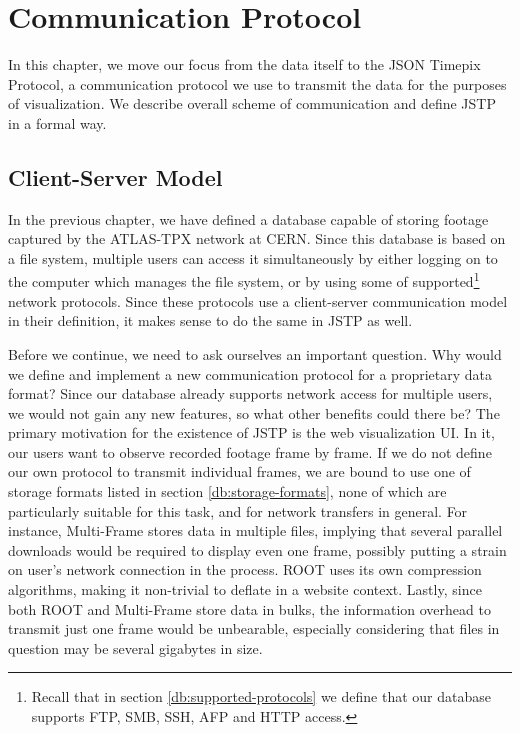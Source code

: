 \chapter{Communication Protocol}

In this chapter, we move our focus from the data itself to the JSON Timepix Protocol, a communication protocol we use to transmit the data for the purposes of visualization. We describe overall scheme of communication and define JSTP in a formal way.

\section{Client-Server Model}
In the previous chapter, we have defined a database capable of storing footage captured by the ATLAS-TPX network at CERN. Since this database is based on a file system, multiple users can access it simultaneously by either logging on to the computer which manages the file system, or by using some of supported\footnote{Recall that in section \ref{db:supported-protocols} we define that our database supports FTP, SMB, SSH, AFP and HTTP access.} network protocols. Since these protocols use a client-server communication model in their definition, it makes sense to do the same in JSTP as well.

Before we continue, we need to ask ourselves an important question. Why would we define and implement a new communication protocol for a proprietary data format? Since our database already supports network access for multiple users, we would not gain any new features, so what other benefits could there be? The primary motivation for the existence of JSTP is the web visualization UI. In it, our users want to observe recorded footage frame by frame. If we do not define our own protocol to transmit individual frames, we are bound to use one of storage formats listed in section \ref{db:storage-formats}, none of which are particularly suitable for this task, and for network transfers in general. For instance, Multi-Frame stores data in multiple files, implying that several parallel downloads would be required to display even one frame, possibly putting a strain on user's network connection in the process. ROOT uses its own compression algorithms, making it non-trivial to deflate in a website context. Lastly, since both ROOT and Multi-Frame store data in bulks, the information overhead to transmit just one frame would be unbearable, especially considering that files in question may be several gigabytes in size.

